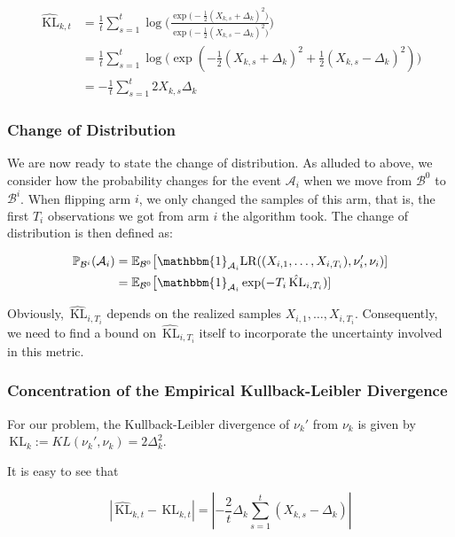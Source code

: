 \documentclass[12pt,]{article}
\newcommand{\KL}{\,\text{KL}}
\begin{document}
\begin{align*}
\hat{\KL}_{k,t} & = \frac{1}{t} \sum_{s=1}^{t} \log \big(\frac{\exp \big(-\frac{1}{2} (X_{k,s}+\Delta_k)^2\big)}{\exp \big(-\frac{1}{2} (X_{k,s}-\Delta_k)^2\big)} \big) \\
& = \frac{1}{t} \sum_{s=1}^{t} \log \big( \exp(-\frac{1}{2} (X_{k,s}+\Delta_k)^2 + \frac{1}{2} (X_{k,s}-\Delta_k)^2) \big) \\
& = - \frac{1}{t} \sum_{s=1}^{t} 2 X_{k,s} \Delta_k
\end{align*}

\subsubsection{Change of Distribution}\label{change-of-distribution}

We are now ready to state the change of distribution. As alluded to
above, we consider how the probability changes for the event
\(\mathcal{A}_i\) when we move from \(\mathcal{B}^0\) to
\(\mathcal{B}^i\). When flipping arm \(i\), we only changed the samples
of this arm, that is, the first \(T_i\) observations we got from arm
\(i\) the algorithm took. The change of distribution is then defined as:

\begin{align*}
\mathbb{P}_{\mathcal{B}^i}(\mathcal{A}_i) & = \mathbb{E}_{\mathcal{B}^0} \big[\mathbbm{1}_{\mathcal{A}_i} \text{LR}((X_{i,1}, \dots,X_{i,T_i}), \nu_i', \nu_i) ] \\
& = \mathbb{E}_{\mathcal{B}^0} \big[\mathbbm{1}_{\mathcal{A}_i} \exp (- T_i \hat{\KL}_{i,T_i}) ]
\end{align*}

Obviously, \(\hat{\KL}_{i,T_i}\) depends on the realized samples
\(X_{i,1}, \dots,X_{i,T_i}\). Consequently, we need to find a bound on
\(\hat{\KL}_{i,T_i}\) itself to incorporate the uncertainty involved in
this metric.

\subsubsection{Concentration of the Empirical Kullback-Leibler
Divergence}\label{concentration-of-the-empirical-kullback-leibler-divergence}

For our problem, the Kullback-Leibler divergence of \(\nu_k'\) from
\(\nu_k\) is given by \(\KL_k := KL(\nu_k', \nu_k) = 2\Delta_k^2\).

It is easy to see that

\begin{equation*}
|\hat{\KL}_{k,t} - \KL_{k,t}| = |-\frac{2}{t} \Delta_k \sum_{s=1}^{t}(X_{k,s} - \Delta_k)|
\end{equation*}
\end{document}

